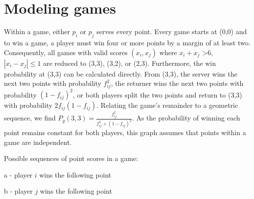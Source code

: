 \documentclass[chapterprefix=false]{report}
\begin{document}


\section{Modeling games}

Within a game, either $p_i$ or $p_j$ serves every point. Every game starts at (0,0) and to win a game, a player must win four or more points by a margin of at least two. Consequently, all games with valid scores $(x_i,x_j)$ where $x_i+x_j$ \textgreater $6,$ $|x_i-x_j| \leq 1$ are reduced to (3,3), (3,2), or (2,3). Furthermore, the win probability at (3,3) can be calculated directly. From (3,3), the server wins the next two points with probability $f_{ij}^2$, the returner wins the next two points with probability $(1-f_{ij})^2$, or both players split the two points and return to (3,3) with probability $2f_{ij}(1-f_{ij})$. Relating the game's remainder to a geometric sequence, we find $P_g(3,3) = \frac{f_{ij}^2}{f_{ij}^2+(1-f_{ij})^2}$. As the probability of winning each point remains constant for both players, this graph assumes that points within a game are independent.

Possible sequences of point scores in a game:

a - player $i$ wins the following point

b - player $j$ wins the following point
\end{document}
